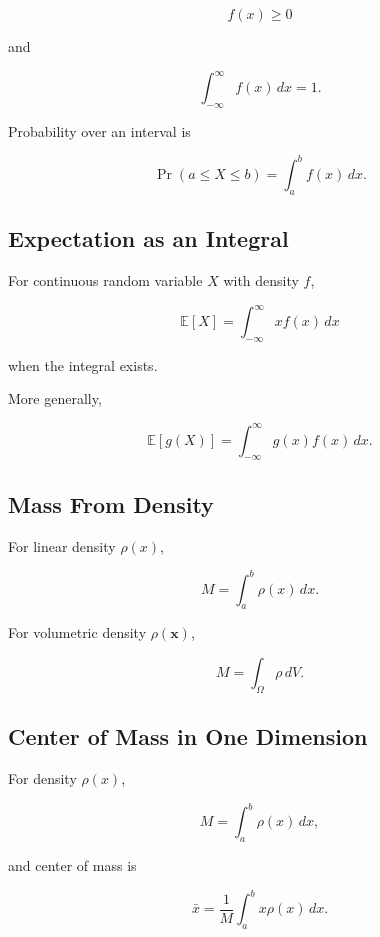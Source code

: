 \[
\boxed{
f(x)\geq0
}
\]

and

\[
\boxed{
\int_{-\infty}^{\infty}
f(x)\,dx
=
1.
}
\]

Probability over an interval is

\[
\boxed{
\Pr(a\leq X\leq b)
=
\int_a^b
f(x)\,dx.
}
\]

\subsection{Expectation as an Integral}
\label{subsec:expectation-integral-reference}

For continuous random variable \(X\) with density \(f\),

\[
\boxed{
\mathbb{E}[X]
=
\int_{-\infty}^{\infty}
x f(x)\,dx
}
\]

when the integral exists.

More generally,

\[
\boxed{
\mathbb{E}[g(X)]
=
\int_{-\infty}^{\infty}
g(x)f(x)\,dx.
}
\]

\subsection{Mass From Density}
\label{subsec:mass-density-integral-reference}

For linear density \(\rho(x)\),

\[
\boxed{
M
=
\int_a^b
\rho(x)\,dx.
}
\]

For volumetric density \(\rho(\mathbf{x})\),

\[
\boxed{
M
=
\int_{\Omega}
\rho
\,dV.
}
\]

\subsection{Center of Mass in One Dimension}
\label{subsec:center-mass-one-dimensional}

For density \(\rho(x)\),

\[
\boxed{
M
=
\int_a^b
\rho(x)\,dx,
}
\]

and center of mass is

\[
\boxed{
\bar{x}
=
\frac{
1
}{
M
}
\int_a^b
x\rho(x)\,dx.
}
\]

